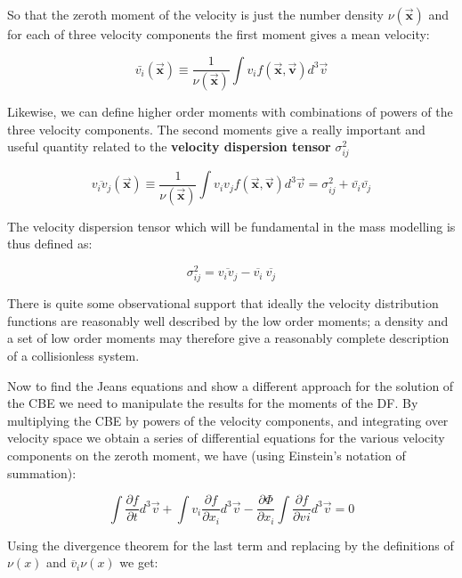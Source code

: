 So that the zeroth moment of the velocity is just the number density $\nu(\vec{\textbf{x}})$ and for each of three velocity components the first moment gives a mean velocity:

\begin{equation}
\bar{v_{i}}(\vec{\textbf{x}})\equiv \frac{1}{\nu(\vec{\textbf{x}})}\int v_{i}f(\vec{\textbf{x}},\vec{\textbf{v}})d^{3}\vec{v}
\end{equation}

Likewise, we can define higher order moments with combinations of powers of the three velocity components. The second moments give a really important and useful quantity related to the \textbf{velocity dispersion tensor} $\sigma^{2}_{ij}$

\begin{equation}
\overline{v_{i}v_{j}}(\vec{\textbf{x}})\equiv \frac{1}{\nu(\vec{\textbf{x}})}\int v_{i}v_{j}f(\vec{\textbf{x}},\vec{\textbf{v}})d^{3}\vec{v}=\sigma^{2}
_{ij}+\bar{v_{i}}\bar{v_{j}}
\end{equation}

The velocity dispersion tensor which will be fundamental in the mass modelling is thus defined as:

\begin{equation}
\sigma_{ij}^{2}=\overline{v_{i}v_{j}}-\overline{v_{i}}\:\overline{v_{j}}
\end{equation}

There is quite some observational support that ideally the velocity distribution functions are reasonably well described by the low order moments; a density and a set of low order moments may therefore give a reasonably complete description of a collisionless system. 

Now to find the Jeans equations and show a different approach for the solution of the CBE we need to manipulate the results for the moments of the DF. By multiplying the CBE by powers of the velocity components, and integrating over velocity space we obtain a series of differential equations for the various velocity components on the zeroth moment, we have (using Einstein's notation of summation):

\begin{equation}
\int \frac{\partial f}{\partial t}d^{3}\vec{v}+ \int v_{i}\frac{\partial f}{\partial x_{i}} d^{3}\vec{v}- \frac{\partial\Phi}{\partial x_{i}}\int \frac{\partial f}{\partial v_{}i} d^{3}\vec{v}= 0
\end{equation}

Using the divergence theorem for the last term and replacing by the definitions of $\nu(x)$ and $\overline{v}_{i}\nu(x)$ we get:

